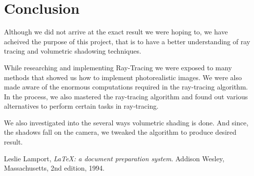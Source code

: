 \documentclass[paper=a4, fontsize=11pt]{scrartcl}
\numberwithin{equation}{section}		%
\numberwithin{figure}{section}			%
\numberwithin{table}{section}				%
\begin{document}
\section{Conclusion}
\par Although we did not arrive at the exact result we were hoping to, we have acheived the purpose of this project, that is to have a better understanding of ray tracing and volumetric shadowing techniques.
\par While researching and implementing Ray-Tracing we were exposed to many methods that showed us how to implement photorealistic images. We were also made aware of the enormous computations required in the ray-tracing algorithm. In the process, we also mastered the ray-tracing algorithm and found out various alternatives to perform certain tasks in ray-tracing.
\par We also investigated into the several ways volumetric shading is done. And since, the shadows fall on the camera, we tweaked the algorithm to produce desired result.

\begin{thebibliography}{9}
  Leslie Lamport,
  \emph{\LaTeX: a document preparation system}.
  Addison Wesley, Massachusetts,
  2nd edition,
  1994.
\end{thebibliography}

\end{document}
